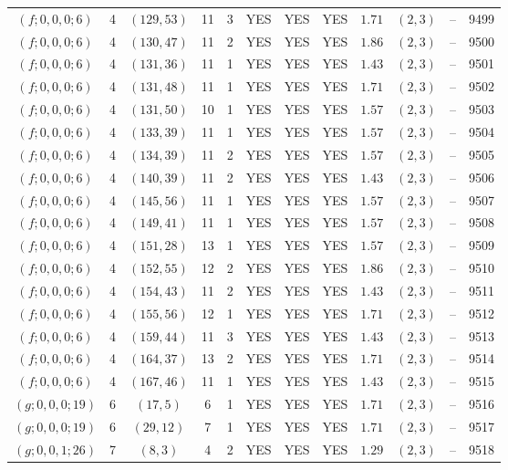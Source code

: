 \begin{longtable}{|c|c|c|c|c|c|c|c|c|c|c|c|}
$(f;0,0,0;6)$ & 4 & $(129,53)$ & 11 & 3 & YES & YES & YES & $1.71$ & $(2,3)$ & -- & 9499\\
$(f;0,0,0;6)$ & 4 & $(130,47)$ & 11 & 2 & YES & YES & YES & $1.86$ & $(2,3)$ & -- & 9500\\
$(f;0,0,0;6)$ & 4 & $(131,36)$ & 11 & 1 & YES & YES & YES & $1.43$ & $(2,3)$ & -- & 9501\\
$(f;0,0,0;6)$ & 4 & $(131,48)$ & 11 & 1 & YES & YES & YES & $1.71$ & $(2,3)$ & -- & 9502\\
$(f;0,0,0;6)$ & 4 & $(131,50)$ & 10 & 1 & YES & YES & YES & $1.57$ & $(2,3)$ & -- & 9503\\
$(f;0,0,0;6)$ & 4 & $(133,39)$ & 11 & 1 & YES & YES & YES & $1.57$ & $(2,3)$ & -- & 9504\\
$(f;0,0,0;6)$ & 4 & $(134,39)$ & 11 & 2 & YES & YES & YES & $1.57$ & $(2,3)$ & -- & 9505\\
$(f;0,0,0;6)$ & 4 & $(140,39)$ & 11 & 2 & YES & YES & YES & $1.43$ & $(2,3)$ & -- & 9506\\
$(f;0,0,0;6)$ & 4 & $(145,56)$ & 11 & 1 & YES & YES & YES & $1.57$ & $(2,3)$ & -- & 9507\\
$(f;0,0,0;6)$ & 4 & $(149,41)$ & 11 & 1 & YES & YES & YES & $1.57$ & $(2,3)$ & -- & 9508\\
$(f;0,0,0;6)$ & 4 & $(151,28)$ & 13 & 1 & YES & YES & YES & $1.57$ & $(2,3)$ & -- & 9509\\
$(f;0,0,0;6)$ & 4 & $(152,55)$ & 12 & 2 & YES & YES & YES & $1.86$ & $(2,3)$ & -- & 9510\\
$(f;0,0,0;6)$ & 4 & $(154,43)$ & 11 & 2 & YES & YES & YES & $1.43$ & $(2,3)$ & -- & 9511\\
$(f;0,0,0;6)$ & 4 & $(155,56)$ & 12 & 1 & YES & YES & YES & $1.71$ & $(2,3)$ & -- & 9512\\
$(f;0,0,0;6)$ & 4 & $(159,44)$ & 11 & 3 & YES & YES & YES & $1.43$ & $(2,3)$ & -- & 9513\\
$(f;0,0,0;6)$ & 4 & $(164,37)$ & 13 & 2 & YES & YES & YES & $1.71$ & $(2,3)$ & -- & 9514\\
$(f;0,0,0;6)$ & 4 & $(167,46)$ & 11 & 1 & YES & YES & YES & $1.43$ & $(2,3)$ & -- & 9515\\
$(g;0,0,0;19)$ & 6 & $(17,5)$ & 6 & 1 & YES & YES & YES & $1.71$ & $(2,3)$ & -- & 9516\\
$(g;0,0,0;19)$ & 6 & $(29,12)$ & 7 & 1 & YES & YES & YES & $1.71$ & $(2,3)$ & -- & 9517\\
$(g;0,0,1;26)$ & 7 & $(8,3)$ & 4 & 2 & YES & YES & YES & $1.29$ & $(2,3)$ & -- & 9518\\

\end{longtable}
